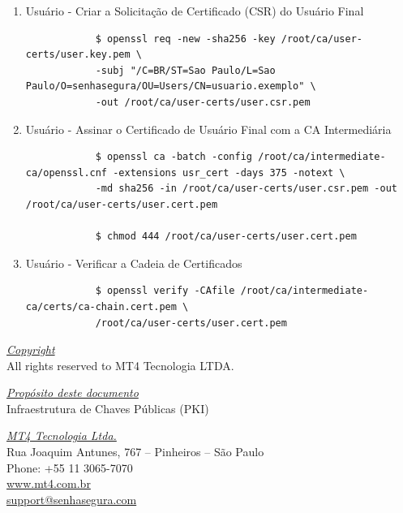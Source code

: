 \begin{enumerate}
\begin{tcolorbox}[width=\textwidth]
{\begin{verbatim}
			$ chmod 400 /root/ca/user-certs/user.key.pem
		\end{verbatim}
	}
	\end{tcolorbox}

	\item Usuário - Criar a Solicitação de Certificado (CSR) do Usuário Final
	\begin{tcolorbox}[width=\textwidth]
	{\footnotesize
		\begin{verbatim}
			$ openssl req -new -sha256 -key /root/ca/user-certs/user.key.pem \
			-subj "/C=BR/ST=Sao Paulo/L=Sao Paulo/O=senhasegura/OU=Users/CN=usuario.exemplo" \
			-out /root/ca/user-certs/user.csr.pem
		\end{verbatim}
	}
	\end{tcolorbox}

	\item Usuário - Assinar o Certificado de Usuário Final com a CA Intermediária
	\begin{tcolorbox}[width=\textwidth]
	{\footnotesize
		\begin{verbatim}
			$ openssl ca -batch -config /root/ca/intermediate-ca/openssl.cnf -extensions usr_cert -days 375 -notext \
			-md sha256 -in /root/ca/user-certs/user.csr.pem -out /root/ca/user-certs/user.cert.pem

			$ chmod 444 /root/ca/user-certs/user.cert.pem
		\end{verbatim}
	}
	\end{tcolorbox}

	\item Usuário - Verificar a Cadeia de Certificados
	\begin{tcolorbox}[width=\textwidth]
	{\footnotesize
		\begin{verbatim}
			$ openssl verify -CAfile /root/ca/intermediate-ca/certs/ca-chain.cert.pem \
			/root/ca/user-certs/user.cert.pem
		\end{verbatim}
	}
	\end{tcolorbox}

\end{enumerate}

\pagebreak

\vspace*{\fill}
\begin{flushright}
	\underline{\textit{Copyright}}\\
	All rights reserved to MT4 Tecnologia LTDA.\bigskip

	\underline{\textit{Propósito deste documento}}\\
	Infraestrutura de Chaves Públicas (PKI)\bigskip
	
	\underline{\textit{MT4 Tecnologia Ltda.}}\\
	Rua Joaquim Antunes, 767 – Pinheiros – São Paulo\\
	Phone: +55 11 3065-7070\\
	\url{www.mt4.com.br}\\
	\href{mailto:support@senhasegura.com}{support@senhasegura.com}\\
\end{flushright}
